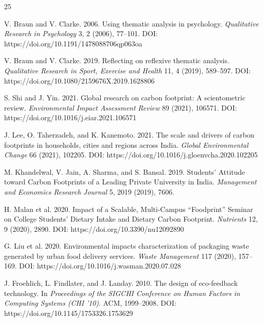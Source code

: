 \documentclass[12pt, a4paper]{article}
\begin{document}
\begin{thebibliography}{25}
\footnotesize

V. Braun and V. Clarke. 2006. Using thematic analysis in psychology. \textit{Qualitative Research in Psychology} 3, 2 (2006), 77--101. DOI: https://doi.org/10.1191/1478088706qp063oa

V. Braun and V. Clarke. 2019. Reflecting on reflexive thematic analysis. \textit{Qualitative Research in Sport, Exercise and Health} 11, 4 (2019), 589--597. DOI: https://doi.org/10.1080/2159676X.2019.1628806

S. Shi and J. Yin. 2021. Global research on carbon footprint: A scientometric review. \textit{Environmental Impact Assessment Review} 89 (2021), 106571. DOI: https://doi.org/10.1016/j.eiar.2021.106571

J. Lee, O. Taherzadeh, and K. Kanemoto. 2021. The scale and drivers of carbon footprints in households, cities and regions across India. \textit{Global Environmental Change} 66 (2021), 102205. DOI: https://doi.org/10.1016/j.gloenvcha.2020.102205

M. Khandelwal, V. Jain, A. Sharma, and S. Bansal. 2019. Students' Attitude toward Carbon Footprints of a Leading Private University in India. \textit{Management and Economics Research Journal} 5, 2019 (2019), 7606.

H. Malan et al. 2020. Impact of a Scalable, Multi-Campus ``Foodprint'' Seminar on College Students' Dietary Intake and Dietary Carbon Footprint. \textit{Nutrients} 12, 9 (2020), 2890. DOI: https://doi.org/10.3390/nu12092890

G. Liu et al. 2020. Environmental impacts characterization of packaging waste generated by urban food delivery services. \textit{Waste Management} 117 (2020), 157--169. DOI: https://doi.org/10.1016/j.wasman.2020.07.028

J. Froehlich, L. Findlater, and J. Landay. 2010. The design of eco-feedback technology. In \textit{Proceedings of the SIGCHI Conference on Human Factors in Computing Systems (CHI '10)}. ACM, 1999--2008. DOI: https://doi.org/10.1145/1753326.1753629


\end{thebibliography}
\end{document}
